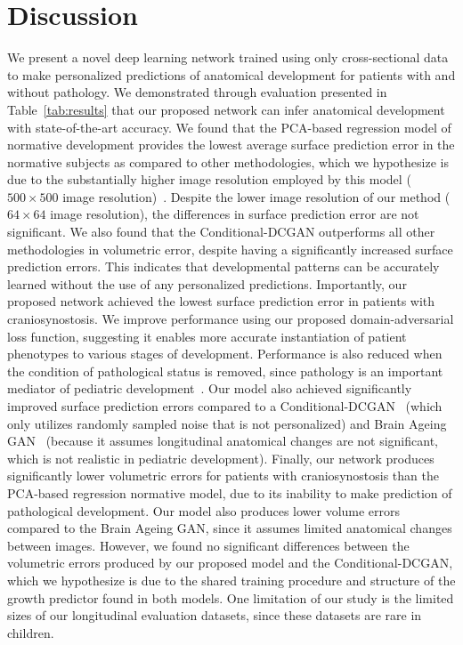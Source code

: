 \documentclass[conference]{IEEEtran}
\begin{document}
\section{Discussion}
We present a novel deep learning network trained using only cross-sectional data to make personalized predictions of anatomical development for patients with and without pathology. We demonstrated through evaluation presented in Table~\ref{tab:results} that our proposed network can infer anatomical development with state-of-the-art accuracy.
We found that the PCA-based regression model of normative development provides the lowest average surface prediction error in the normative subjects as compared to other methodologies, which we hypothesize is due to the substantially higher image resolution employed by this model ($500\times500$ image resolution)~\cite{Liu2022Data-driven}. Despite the lower image resolution of our method ($64\times64$ image resolution), the differences in surface prediction error are not significant.
We also found that the Conditional-DCGAN outperforms all other methodologies in volumetric error,  despite having a significantly increased surface prediction errors. This indicates that developmental patterns can be accurately learned without the use of any personalized predictions. 
Importantly, our proposed network achieved the lowest surface prediction error in patients with craniosynostosis. We improve performance using our proposed domain-adversarial loss function, suggesting it enables more accurate instantiation of patient phenotypes to various stages of development. Performance is also reduced when the condition of pathological status is removed, since pathology is an important mediator of pediatric development~\cite{Likus2014Cephalic}. Our model also achieved significantly improved surface prediction errors compared to a Conditional-DCGAN~\cite{Radford2016Unsupervised} (which only utilizes randomly sampled noise that is not personalized) and Brain Ageing GAN~\cite{Xia2021Learning} (because it assumes longitudinal anatomical changes are not significant, which is not realistic in pediatric development).
Finally, our network produces significantly lower volumetric errors for patients with craniosynostosis than the PCA-based regression normative model, due to its inability to make prediction of pathological development. Our model also produces lower volume errors compared to the Brain Ageing GAN, since it assumes limited anatomical changes between images. However, we found no significant differences between the volumetric errors produced by our proposed model and the Conditional-DCGAN, which we hypothesize is due to the shared training procedure and structure of the growth predictor found in both models. One limitation of our study is the limited sizes of our longitudinal evaluation datasets, since these datasets are rare in children.
\end{document}
